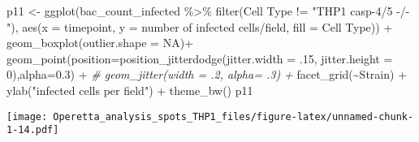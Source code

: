 \documentclass[
]{article}
\newenvironment{Shaded}{\begin{snugshade}}{\end{snugshade}}
\newcommand{\AttributeTok}[1]{\textcolor[rgb]{0.77,0.63,0.00}{#1}}
\newcommand{\CommentTok}[1]{\textcolor[rgb]{0.56,0.35,0.01}{\textit{#1}}}
\newcommand{\ConstantTok}[1]{\textcolor[rgb]{0.00,0.00,0.00}{#1}}
\newcommand{\DecValTok}[1]{\textcolor[rgb]{0.00,0.00,0.81}{#1}}
\newcommand{\FloatTok}[1]{\textcolor[rgb]{0.00,0.00,0.81}{#1}}
\newcommand{\FunctionTok}[1]{\textcolor[rgb]{0.00,0.00,0.00}{#1}}
\newcommand{\NormalTok}[1]{#1}
\newcommand{\OtherTok}[1]{\textcolor[rgb]{0.56,0.35,0.01}{#1}}
\newcommand{\SpecialCharTok}[1]{\textcolor[rgb]{0.00,0.00,0.00}{#1}}
\newcommand{\StringTok}[1]{\textcolor[rgb]{0.31,0.60,0.02}{#1}}
\begin{document}
\begin{Shaded}
\begin{Highlighting}[]
\NormalTok{p11 }\OtherTok{\textless{}{-}} \FunctionTok{ggplot}\NormalTok{(bac\_count\_infected }\SpecialCharTok{\%\textgreater{}\%} 
                \FunctionTok{filter}\NormalTok{(}\StringTok{\textasciigrave{}}\AttributeTok{Cell Type}\StringTok{\textasciigrave{}} \SpecialCharTok{!=} \StringTok{"THP1 casp{-}4/5 {-}/{-}"}\NormalTok{), }\FunctionTok{aes}\NormalTok{(}\AttributeTok{x =}\NormalTok{ timepoint, }\AttributeTok{y =} \StringTok{\textasciigrave{}}\AttributeTok{number of infected cells/field}\StringTok{\textasciigrave{}}\NormalTok{, }\AttributeTok{fill =} \StringTok{\textasciigrave{}}\AttributeTok{Cell Type}\StringTok{\textasciigrave{}}\NormalTok{)) }\SpecialCharTok{+}
  \FunctionTok{geom\_boxplot}\NormalTok{(}\AttributeTok{outlier.shape =} \ConstantTok{NA}\NormalTok{)}\SpecialCharTok{+}
  \FunctionTok{geom\_point}\NormalTok{(}\AttributeTok{position=}\FunctionTok{position\_jitterdodge}\NormalTok{(}\AttributeTok{jitter.width =}\NormalTok{ .}\DecValTok{15}\NormalTok{, }\AttributeTok{jitter.height =} \DecValTok{0}\NormalTok{),}\AttributeTok{alpha=}\FloatTok{0.3}\NormalTok{) }\SpecialCharTok{+}
  \CommentTok{\#  geom\_jitter(width = .2, alpha= .3) +}
  \FunctionTok{facet\_grid}\NormalTok{(}\SpecialCharTok{\textasciitilde{}}\NormalTok{Strain) }\SpecialCharTok{+}
  \FunctionTok{ylab}\NormalTok{(}\StringTok{"infected cells per field"}\NormalTok{) }\SpecialCharTok{+}
  \FunctionTok{theme\_bw}\NormalTok{()}
\NormalTok{p11}
\end{Highlighting}
\end{Shaded}

\texttt{[image: Operetta\_analysis\_spots\_THP1\_files/figure-latex/unnamed-chunk-1-14.pdf]}
\end{document}
